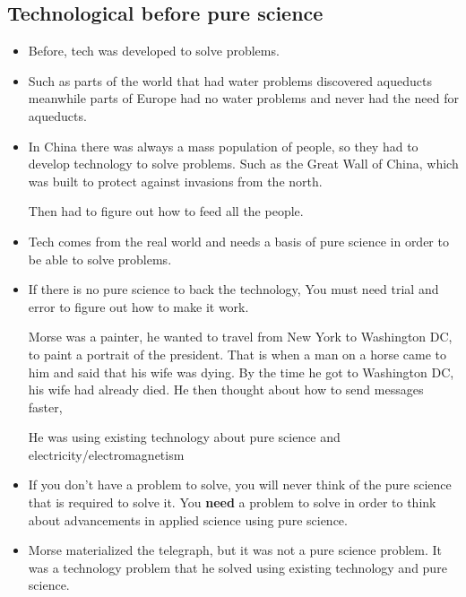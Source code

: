 \documentclass{article}
\begin{document}
\subsection{Technological before pure science}
\begin{itemize}
  \item Before, tech was developed to solve problems.
  \item Such as parts of the world that had water problems discovered
    aqueducts meanwhile parts of Europe had no water problems and
    never had the need for aqueducts.
  \item In China there was always a mass population of people,
    so they had to develop technology to solve problems.
    Such as the Great Wall of China, which was built to protect
    against invasions from the north.

    Then had to figure out how to feed all the people.
  \item Tech comes from the real world and needs a basis of pure science
    in order to be able to solve problems.
  \item If there is no pure science to back the technology,
    You must need trial and error to figure out how to make it work.

    Morse was a painter, he wanted to travel from New York to Washington DC,
    to paint a portrait of the president.
    That is when a man on a horse came to him and said that his wife was dying.
    By the time he got to Washington DC, his wife had already died.
    He then thought about how to send messages faster,

    He was using existing technology about pure science and electricity/electromagnetism
  \item If you don't have a problem to solve, you will never think of
    the pure science that is required to solve it.
    You \textbf{need} a problem to solve in order to think about advancements in applied science
    using pure science.
  \item Morse materialized the telegraph, but it was not a pure science problem.
    It was a technology problem that he solved using existing technology
    and pure science.
\end{itemize}
\end{document}
